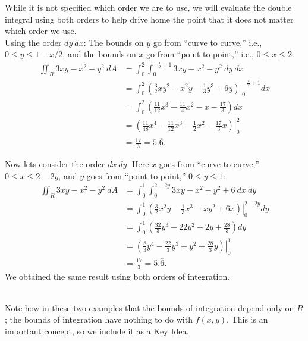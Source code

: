 {While it is not specified which order we are to use, we will evaluate the double integral using both orders to help drive home the point that it does not matter which order we use.\\

Using the order $dy\ dx$:
The bounds on $y$ go from ``curve to curve,'' i.e., $0\leq y\leq 1-x/2$, and the bounds on $x$ go from ``point to point,'' i.e., $0\leq x\leq 2$.
\begin{align*}
\iint_R 3xy-x^2-y^2\ dA &= \int_0^2\int_0^{-\frac x2+1} 3xy-x^2-y^2\ dy\ dx\\
		&= \int_0^2\left.\left(\frac32xy^2-x^2y-\frac13y^3+6y\right)\right|_0^{-\frac x2+1}dx\\
		&= \int_0^2 \left(\frac{11}{12}x^3-\frac{11}{4}x^2-x-\frac{17}3\right)dx \\
		&= \left.\left(\frac{11}{48}x^4-\frac{11}{12}x^3-\frac12x^2-\frac{17}3x\right)\right|_0^2\\
		&= \frac{17}3=5.\overline{6}.
\end{align*}

Now lets consider the order $dx \ dy$. Here $x$ goes from ``curve to curve,'' $0\leq x\leq 2-2y$, and $y$ goes from ``point to point,'' $0\leq y\leq 1$:
\begin{align*}
\iint_R 3xy-x^2-y^2\ dA &= \int_0^1\int_0^{2-2y} 3xy-x^2-y^2+6\ dx\ dy\\
		&= \int_0^1\left.\left(\frac32x^2y-\frac13x^3-xy^2+6x\right)\right|_0^{2-2y} dy\\
		&= \int_0^1\left(\frac{32}3y^3-22y^2+2y+\frac{28}3\right)dy\\
		&=\left.\left(\frac83y^4-\frac{22}3y^3+y^2+\frac{28}3y\right)\right|_0^1\\
		&=\frac{17}3=5.\overline{6}.
\end{align*}
We obtained the same result using both orders of integration. 
}\\

 Note how in these two examples that the bounds of integration depend only on $R$; the bounds of integration have nothing to do with $f(x,y)$. This is an important concept, so we include it  as a Key Idea.

